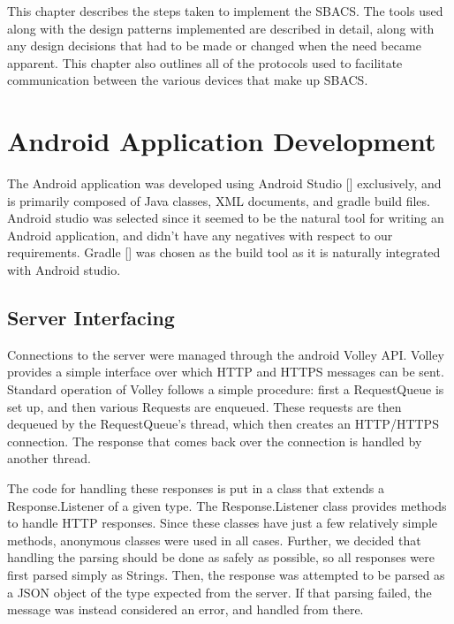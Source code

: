\documentclass[12pt]{report}
\let\Oldsection\section
\renewcommand{\section}{\FloatBarrier\Oldsection}
\let\Oldsubsection\subsection
\renewcommand{\subsection}{\FloatBarrier\Oldsubsection}
\begin{document}
This chapter describes the steps taken to implement the SBACS. The tools used along with the design patterns implemented
are described in detail, along with any design decisions that had to be made or changed when the need became apparent.
This chapter also outlines all of the protocols used to facilitate communication between the various devices that make
up SBACS.


\section{Android Application Development} \label{android-application-development}

The Android application was developed using Android Studio [] exclusively, and is primarily composed of Java classes, XML
documents, and gradle build files. Android studio was selected since it seemed to be the natural tool for writing an
Android application, and didn't have any negatives with respect to our requirements. Gradle [] was chosen as the build
tool as it is naturally integrated with Android studio.


\subsection{Server Interfacing} \label{server-interfacing}

Connections to the server were managed through the android Volley API. Volley provides a simple interface over which
HTTP and HTTPS messages can be sent. Standard operation of Volley follows a simple procedure: first a RequestQueue is
set up, and then various Requests are enqueued. These requests are then dequeued by the RequestQueue's thread, which
then creates an HTTP/HTTPS connection. The response that comes back over the connection is handled by another thread.

The code for handling these responses is put in a class that extends a Response.Listener of a given type. The
Response.Listener class provides methods to handle HTTP responses. Since these classes have just a few relatively simple
methods, anonymous classes were used in all cases. Further, we decided that handling the parsing should be done as
safely as possible, so all responses were first parsed simply as Strings. Then, the response was attempted to be parsed
as a JSON object of the type expected from the server. If that parsing failed, the message was instead considered an
error, and handled from there.
\end{document}
